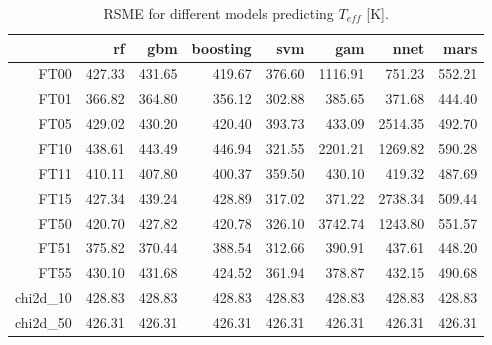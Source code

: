 \begin{table}[ht]
\centering
\begin{tabular}{rrrrrrrr}
  \hline
 & rf & gbm & boosting & svm & gam & nnet & mars \\ 
  \hline
  FT00 & 427.33 & 431.65 & 419.67 & 376.60 & 1116.91 & 751.23 & 552.21 \\ 
  FT01 & 366.82 & 364.80 & 356.12 & 302.88 & 385.65 & 371.68 & 444.40 \\ 
  FT05 & 429.02 & 430.20 & 420.40 & 393.73 & 433.09 & 2514.35 & 492.70 \\ 
  FT10 & 438.61 & 443.49 & 446.94 & 321.55 & 2201.21 & 1269.82 & 590.28 \\ 
  FT11 & 410.11 & 407.80 & 400.37 & 359.50 & 430.10 & 419.32 & 487.69 \\ 
  FT15 & 427.34 & 439.24 & 428.89 & 317.02 & 371.22 & 2738.34 & 509.44 \\ 
  FT50 & 420.70 & 427.82 & 420.78 & 326.10 & 3742.74 & 1243.80 & 551.57 \\ 
  FT51 & 375.82 & 370.44 & 388.54 & 312.66 & 390.91 & 437.61 & 448.20 \\ 
  FT55 & 430.10 & 431.68 & 424.52 & 361.94 & 378.87 & 432.15 & 490.68 \\ 
  chi2d\_10 & 428.83 & 428.83 & 428.83 & 428.83 & 428.83 & 428.83 & 428.83 \\ 
  chi2d\_50 & 426.31 & 426.31 & 426.31 & 426.31 & 426.31 & 426.31 & 426.31 \\ 
   \hline
\end{tabular}
\caption { RSME for different models predicting $T_{eff}$ [K].} 
\label{tab:models_T_rmse} 
\end{table}


